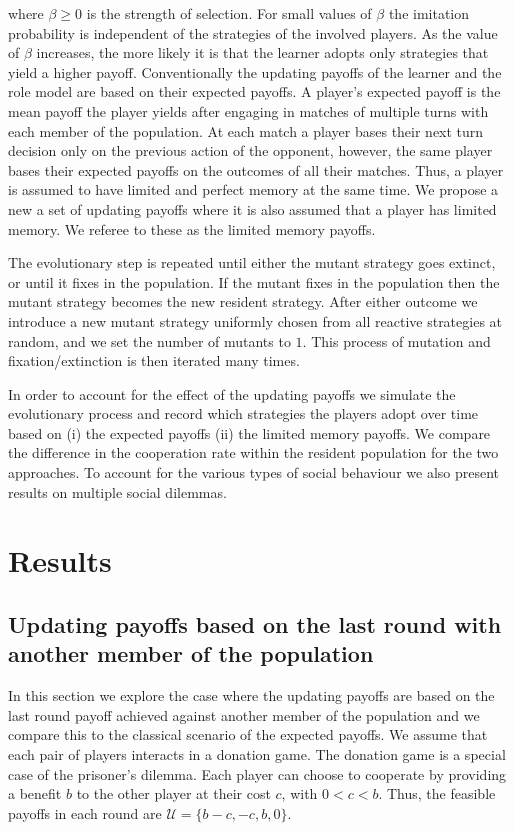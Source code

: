 \documentclass[11pt]{article}
\theoremstyle{plainCl1}
\theoremstyle{plainCl2}
\begin{document}
where $\beta\!\ge\!0$ is the strength of selection. For small values of $\beta$
the imitation probability is independent of the strategies of the involved
players. As the value of $\beta$ increases, the more likely it is that the
learner adopts only strategies that yield a higher payoff.
Conventionally the updating payoffs of the learner and the role model are based
on their expected payoffs. A player's expected payoff is the mean payoff the
player yields after engaging in matches of multiple turns with each member of
the population. At each match a player bases their next turn decision only on
the previous action of the opponent, however, the same player bases their
expected payoffs on the outcomes of all their matches. Thus, a player is assumed
to have limited and perfect memory at the same time. We propose a new a set of
updating payoffs where it is also assumed that a player has limited memory.
We referee to these as the limited memory payoffs.

The evolutionary step is repeated until either the mutant strategy goes
extinct, or until it fixes in the population. If the mutant fixes in the
population then the mutant strategy becomes the new resident strategy. After
either outcome we introduce a new mutant strategy uniformly chosen from all
reactive strategies at random, and we set the number of mutants to $1$. This
process of mutation and fixation/extinction is then iterated many times.

In order to account for the effect of the updating payoffs we simulate the
evolutionary process and record which strategies the players adopt over time
based on (i) the expected payoffs (ii) the limited memory payoffs. We compare
the difference in the cooperation rate within the resident population for the
two approaches. To account for the various types of social behaviour we also
present results on multiple social dilemmas.


\section{Results}\label{section:results}
\subsection{Updating payoffs based on the last round with another member of the population}\label{section:donation}

In this section we explore the case where the updating payoffs are based on the
last round payoff achieved against another member of the population and we compare
this to the classical scenario of the expected payoffs. We assume that each pair
of players interacts in a donation game. The donation game is a special case of
the prisoner's dilemma. Each player can choose to cooperate by providing a
benefit \(b\) to the other player at their cost \(c\), with \(0 < c < b\).
Thus, the feasible payoffs in each round are \(\mathcal{U} = \{b-c, -c, b, 0\}\).
\end{document}
